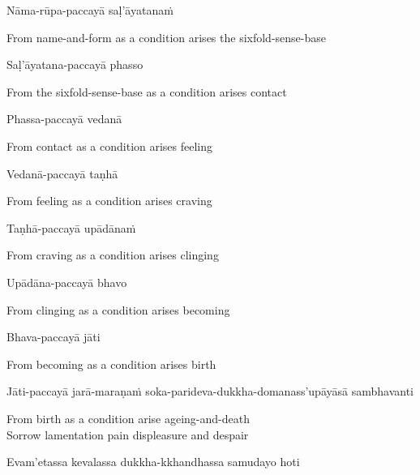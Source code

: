 Nāma-rūpa-paccayā saḷ'āyatanaṁ

\begin{english-hang}
  From name-and-form as a condition arises the sixfold-sense-base
\end{english-hang}

Saḷ'āyatana-paccayā phasso

\begin{english}
  From the sixfold-sense-base as a condition arises contact
\end{english}

\ifbfive\clearpage\fi

Phassa-paccayā vedanā

\begin{english}
  From contact as a condition arises feeling
\end{english}

Vedanā-paccayā taṇhā

\begin{english}
  From feeling as a condition arises craving
\end{english}

Taṇhā-paccayā upādānaṁ

\begin{english}
  From craving as a condition arises clinging
\end{english}

Upādāna-paccayā bhavo

\begin{english}
  From clinging as a condition arises becoming
\end{english}

Bhava-paccayā jāti

\begin{english}
  From becoming as a condition arises birth
\end{english}

\begin{pali-hang}
  Jāti-paccayā jarā-maraṇaṁ soka-parideva-dukkha-domanass'upāyāsā sambhavanti
\end{pali-hang}

\begin{english}
  From birth as a condition arise ageing-and-death\\
  Sorrow lamentation pain displeasure and despair
\end{english}

\begin{pali-hang}
Evam'etassa kevalassa dukkha-kkhandhassa samudayo hoti
\end{pali-hang}

